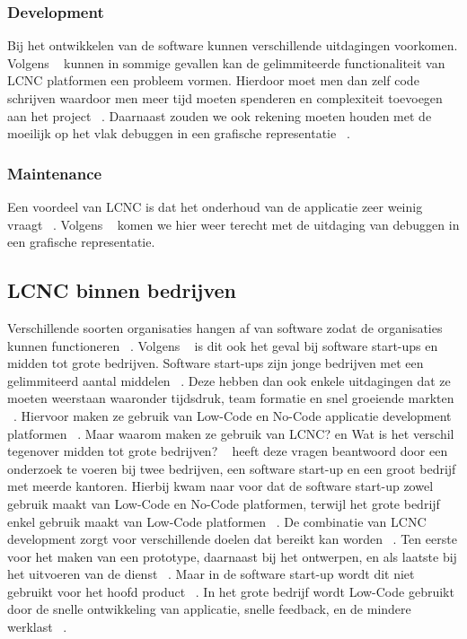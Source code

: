 \subsubsection*{Development}
\label{sub:development}
Bij het ontwikkelen van de software kunnen verschillende uitdagingen voorkomen.
Volgens ~\textcite{Rokis_2022} kunnen in sommige gevallen kan de gelimmiteerde functionaliteit van LCNC platformen een probleem vormen.
Hierdoor moet men dan zelf code schrijven waardoor men meer tijd moeten spenderen en complexiteit toevoegen aan het project ~\autocite{Rokis_2022}.
Daarnaast zouden we ook rekening moeten houden met de moeilijk op het vlak debuggen in een grafische representatie ~\autocite{Rokis_2022}.
\subsubsection*{Maintenance}
\label{sub:maintenance}
Een voordeel van LCNC is dat het onderhoud van de applicatie zeer weinig vraagt ~\autocite{Rokis_2022}.
Volgens ~\textcite{Rokis_2022} komen we hier weer terecht met de uitdaging van debuggen in een grafische representatie.

\subsection*{LCNC binnen bedrijven}
\label{sub:lcnc-binnen-bedrijven}
Verschillende soorten organisaties hangen af van software zodat de organisaties kunnen functioneren ~\autocite{Hintsch2021}.
Volgens ~\textcite{Rafiq_2022} is dit ook het geval bij software start-ups en midden tot grote bedrijven. 
Software start-ups zijn jonge bedrijven met een gelimmiteerd aantal middelen ~\autocite{Rafiq_2022}. 
Deze hebben dan ook enkele uitdagingen dat ze moeten weerstaan waaronder tijdsdruk, team formatie en snel groeiende markten ~\autocite{Rafiq_2022}.
Hiervoor maken ze gebruik van Low-Code en No-Code applicatie development platformen ~\autocite{Rafiq_2022}. 
Maar waarom maken ze gebruik van LCNC? en Wat is het verschil tegenover midden tot grote bedrijven?
~\textcite{Rafiq_2022} heeft deze vragen beantwoord door een onderzoek te voeren bij twee bedrijven, een software start-up en een groot bedrijf met meerde kantoren.
Hierbij kwam naar voor dat de software start-up zowel gebruik maakt van Low-Code en No-Code platformen, terwijl het grote bedrijf enkel gebruik maakt van Low-Code platformen ~\textcite{Rafiq_2022}.
De combinatie van LCNC development zorgt voor verschillende doelen dat bereikt kan worden ~\autocite{Rafiq_2022}.
Ten eerste voor het maken van een prototype, daarnaast bij het ontwerpen, en als laatste bij het uitvoeren van de dienst ~\autocite{Rafiq_2022}.
Maar in de software start-up wordt dit niet gebruikt voor het hoofd product ~\autocite{Rafiq_2022}. In het grote bedrijf wordt Low-Code
gebruikt door de snelle ontwikkeling van applicatie, snelle feedback, en de mindere werklast ~\autocite{Rafiq_2022}.
